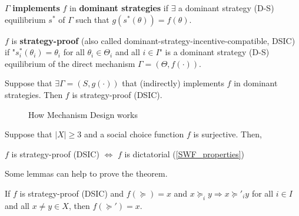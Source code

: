 \documentclass[11pt]{elegantbook}
\begin{document}
\begin{definition}
    \normalfont
    $\Gamma$ \textbf{implements} $f$ in \textbf{dominant strategies} if $\exists$ a dominant strategy (D-S) equilibrium $s^*$ of $\Gamma$ such that $g(s^*(\theta))=f(\theta)$.
\end{definition}

\begin{definition}
    \normalfont
    $f$ is \textbf{strategy-proof} (also called dominant-strategy-incentive-compatible, DSIC) if "$s^*_i(\theta_i)=\theta_i$ for all $\theta_i\in\Theta_i$ and all $i\in I$" is a dominant strategy (D-S) equilibrium of the direct mechanism $\Gamma=(\Theta,f(\cdot))$.
\end{definition}

\begin{theorem}
    Suppose that $\exists \Gamma=(S,g(\cdot))$ that (indirectly) implements $f$ in dominant strategies. Then $f$ is strategy-proof (DSIC).
\end{theorem}

\begin{center}\begin{figure}[htbp]
    \centering
    \caption{How Mechanism Design works}
    \label{}
\end{figure}\end{center}

\begin{theorem}
    Suppose that $|X|\geq 3$ and a social choice function $f$ is surjective. Then,
    \begin{center}
        $f$ is strategy-proof (DSIC) $\Leftrightarrow$ $f$ is dictatorial (\ref{SWF_properties})
    \end{center}
\end{theorem}
Some lemmas can help to prove the theorem.
\begin{lemma}
    If $f$ is strategy-proof (DSIC) and $f(\succeq)=x$ and $x\succeq_i y \Rightarrow x\succeq'_i y$ for all $i\in I$ and all $x\neq y\in X$, then $f(\succeq')=x$.
\end{lemma}
\end{document}
